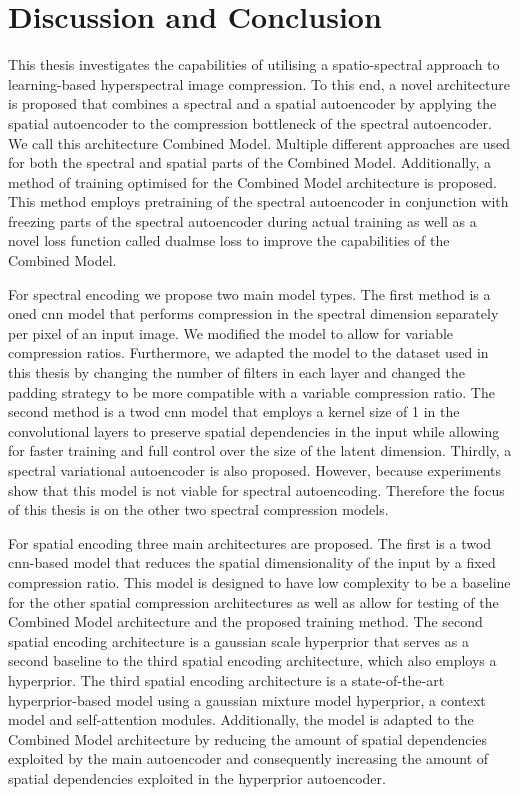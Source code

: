 \chapter{Discussion and Conclusion\label{cha:chapter6}}
This thesis investigates the capabilities of utilising a spatio-spectral approach to learning-based hyperspectral image compression. To this end, a novel architecture is proposed that combines a spectral and a spatial autoencoder by applying the spatial autoencoder to the compression bottleneck of the spectral autoencoder. We call this architecture Combined Model. Multiple different approaches are used for both the spectral and spatial parts of the Combined Model. Additionally, a method of training optimised for the Combined Model architecture is proposed. This method employs pretraining of the spectral autoencoder in conjunction with freezing parts of the spectral autoencoder during actual training as well as a novel loss function called \ac{dualmse} loss to improve the capabilities of the Combined Model.

For spectral encoding we propose two main model types. The first method is a \ac{oned} \ac{cnn} model that performs compression in the spectral dimension separately per pixel of an input image. We modified the model to allow for variable compression ratios. Furthermore, we adapted the model to the dataset used in this thesis by changing the number of filters in each layer and changed the padding strategy to be more compatible with a variable compression ratio. The second method is a \ac{twod} \ac{cnn} model that employs a kernel size of 1 in the convolutional layers to preserve spatial dependencies in the input while allowing for faster training and full control over the size of the latent dimension. Thirdly, a spectral variational autoencoder is also proposed. However, because experiments show that this model is not viable for spectral autoencoding. Therefore the focus of this thesis is on the other two spectral compression models.

For spatial encoding three main architectures are proposed. The first is a \ac{twod} \ac{cnn}-based model that reduces the spatial dimensionality of the input by a fixed compression ratio. This model is designed to have low complexity to be a baseline for the other spatial compression architectures as well as allow for testing of the Combined Model architecture and the proposed training method. The second spatial encoding architecture is a gaussian scale hyperprior that serves as a second baseline to the third spatial encoding architecture, which also employs a hyperprior.
The third spatial encoding architecture is a state-of-the-art hyperprior-based model using a gaussian mixture model hyperprior, a context model and self-attention modules. Additionally, the model is adapted to the Combined Model architecture by reducing the amount of spatial dependencies exploited by the main autoencoder and consequently increasing the amount of spatial dependencies exploited in the hyperprior autoencoder.

